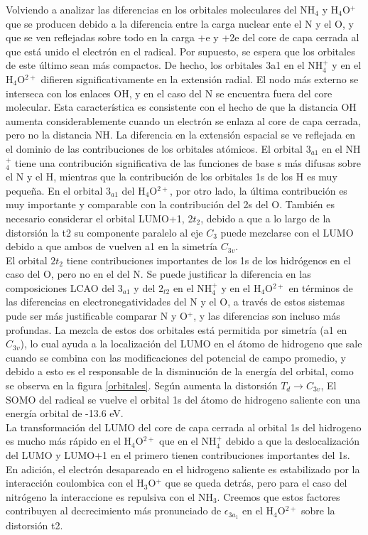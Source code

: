 \documentclass[12pt]{report}
\begin{document}
Volviendo a analizar las diferencias en los orbitales moleculares del NH$_4$ y H$_4$O$^+$ que se producen debido a la diferencia entre la carga nuclear ente el N y el O, y que se ven reflejadas sobre todo en la carga +e y +2e del core de capa cerrada al que está unido el electrón en el radical. Por supuesto, se espera que los orbitales de este último sean más compactos.  De hecho, los orbitales 3a1 en el NH$_4^+$ y en el H$_4$O$^{2+}$ difieren significativamente en la extensión radial. El nodo más externo se interseca con los enlaces OH, y en el caso del N se encuentra fuera del core molecular. Esta característica es consistente con el hecho de que la distancia OH aumenta considerablemente cuando un electrón se enlaza al core de capa cerrada, pero no la distancia NH. 
La diferencia en la extensión espacial se ve reflejada en el dominio de las contribuciones de los orbitales atómicos. El orbital $3_{a1}$ en el NH$_4^+$ tiene una contribución significativa de las funciones de base s más difusas sobre el N y el H, mientras que la contribución de los orbitales 1s de los H es muy pequeña. En el orbital $3_{a1}$ del H$_4$O$^{2+}$, por otro lado, la última contribución es muy importante y comparable con la contribución del 2s del O. 	También es necesario considerar el orbital LUMO+1, 2$t_2$, debido a que a lo largo de la distorsión la t2 su componente paralelo al eje $C_3$ puede mezclarse con el LUMO debido a que ambos de vuelven a1 en la simetría $C_{3v}$. 
\\


El orbital $2t_2$ tiene contribuciones importantes de los 1s de los hidrógenos en el caso del O, pero no en el del N. Se puede justificar la diferencia en las composiciones LCAO del $3_{a1}$ y del $2_{t2}$ en el NH$_4^+$ y en el H$_4$O$^{2+}$ en términos de las diferencias en electronegatividades del N y el O, a través de estos sistemas pude ser más justificable comparar N y O$^+$, y las diferencias son incluso más profundas. La mezcla de estos dos orbitales está permitida por simetría (a1 en $C_{3v}$), lo cual ayuda a la localización del LUMO en el átomo de hidrogeno que sale cuando se combina con las modificaciones del potencial de campo promedio, y debido a esto es el responsable de la disminución de la energía del orbital, como se observa en la figura \ref{orbitales}. Según aumenta la distorsión $T_d \rightarrow C_{3v}$, El SOMO del radical se vuelve el orbital 1s del átomo de hidrogeno saliente con una energía orbital de -13.6 eV. 
\\


La transformación del LUMO del core de capa cerrada al orbital 1s del hidrogeno es mucho más rápido en el H$_4$O$^{2+}$ que en el NH$_4^+$ debido a que la deslocalización del LUMO y LUMO+1 en el primero tienen contribuciones importantes del 1s. En adición, el electrón desapareado en el hidrogeno saliente es estabilizado por la interacción coulombica con el H$_3$O$^+$ que se queda detrás, pero para el caso del nitrógeno la interaccione es repulsiva con el NH$_3$. Creemos que estos factores contribuyen al decrecimiento más pronunciado de $\epsilon_{3a_1}$ en el H$_4$O$^{2+}$ sobre la distorsión t2.
\end{document}
